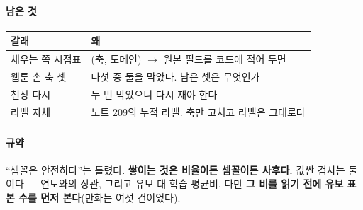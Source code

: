 \documentclass[10pt]{article}
\begin{document}
\paragraph{남은 것}
\begin{center}\small
\begin{tabular}{ll}
\hline
갈래 & 왜 \\
\hline
채우는 쪽 시점표 & (축, 도메인) $\to$ 원본 필드를 코드에 적어 두면 \\
웹툰 손 축 셋 & 다섯 중 둘을 막았다. 남은 셋은 무엇인가 \\
천장 다시 & 두 번 막았으니 다시 재야 한다 \\
라벨 자체 & 노트 209의 누적 라벨. 축만 고치고 라벨은 그대로다 \\
\hline
\end{tabular}
\end{center}

\paragraph{규약} ``셈꼴은 안전하다''는 틀렸다. \textbf{쌓이는 것은 비율이든
셈꼴이든 사후다.} 값싼 검사는 둘이다 --- 연도와의 상관, 그리고 유보 대 학습
평균비. 다만 \textbf{그 비를 읽기 전에 유보 표본 수를 먼저 본다}(만화는
여섯 건이었다).
\end{document}
